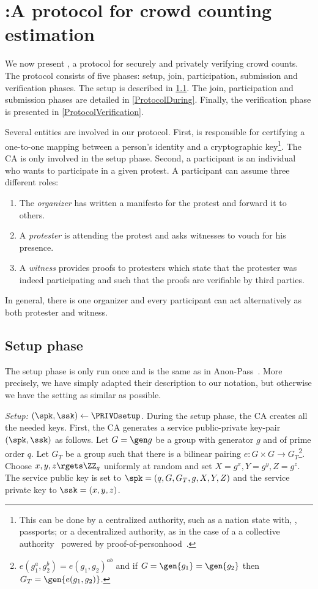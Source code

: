 \section{\PRIVO:\@ A protocol for crowd counting estimation}%
\label{Protocol}


We now present \PRIVO, a protocol for securely and privately verifying crowd counts.
The protocol consists of five phases: setup, join, participation, submission and verification phases.
The setup is described in \cref{ProtocolSetup}.
The join, participation and submission phases are detailed in \cref{ProtocolDuring}.
Finally, the verification phase is presented in \cref{ProtocolVerification}.

Several entities are involved in our protocol.
First,  is responsible for certifying a one-to-one mapping between a 
person's identity and a cryptographic key\footnote{%
  This can be done by a centralized authority, such as a nation state with, 
  \eg, passports; or a decentralized authority, as in the case of a a 
  collective authority~\cite{collective-signing} powered by 
  proof-of-personhood~\cite{proof-of-personhood}.
}.
The \ac{CA} is only involved in the setup phase.
Second, a participant is an individual who wants to participate in a given 
protest.
A participant can assume three different roles:
\begin{enumerate}
\item The \emph{organizer} has written a manifesto for the protest and forward it to others.
\item A \emph{protester} is attending the protest and asks witnesses to vouch 
  for his presence.
\item A \emph{witness} provides proofs to protesters which state that the 
  protester was indeed participating and such that the proofs are verifiable by 
  third parties.
\end{enumerate}
In general, there is one organizer and every participant can act alternatively 
as both protester and witness.

\subsection{Setup phase}%
\label{ProtocolSetup}

The setup phase is only run once and is the same as in Anon-Pass~\cite{AnonPass}.
More precisely, we have simply adapted their description to our notation, but otherwise we have the setting as similar as possible.


\emph{Setup: \((\spk, \ssk)\gets \PRIVOsetup\).}
During the setup phase, the \ac{CA} creates all the needed keys.
First, the \ac{CA} generates a service public-private key-pair \((\spk, \ssk)\) as follows.
Let \(G = \gen g\) be a group with generator \(g\) and of prime order \(q\).
Let \(G_T\) be a group such that there is a bilinear pairing \(e\colon G\times G\to G_T\)\footnote{%
  \Ie \(e(g_1^a, g_2^b) = e(g_1, g_2)^{ab}\) and if \(G = \gen{g_1} = 
    \gen{g_2}\) then \(G_T = \gen{e(g_1, g_2)}\).
}.
Choose \(x,y,z\rgets \ZZ_q\) uniformly at random and set \(X = g^x, Y = g^y, Z = g^z\).
The service public key is set to \(\spk = (q, G, G_T, g, X, Y, Z)\) and the service private key to \(\ssk = (x, y, z)\).



